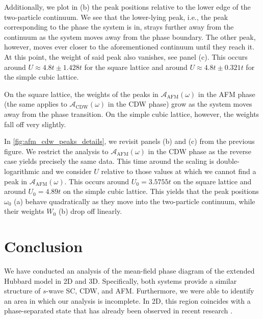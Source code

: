 \documentclass[
    reprint, 
    aps,
    preprintnumbers,
    twocolumn,
    prb,
    superscriptaddress
]{revtex4-2}
\newcommand{\spectral}[1]{\mathcal{A}_\text{#1}  (\omega)}
\begin{document}
Additionally, we plot in (b) the peak positions relative to the lower edge of the two-particle continuum.
We see that the lower-lying peak, i.e., the peak corresponding to the phase the system is in, 
strays further away from the continuum as the system moves away from the phase boundary.
The other peak, however, moves ever closer to the aforementioned continuum until they reach it.
At this point, the weight of said peak also vanishes, see panel (c).
This occurs around $U \approx 4.8t \pm 1.428t$ for the square lattice and around $U \approx 4.8t \pm 0.321t$ for the simple cubic lattice.

On the square lattice, the weights of the peaks in $\spectral{AFM}$ in the AFM phase (the same applies to $\spectral{CDW}$ in the CDW phase) grow as the system moves away from the phase transition.
On the simple cubic lattice, however, the weights fall off very slightly.

In \autoref{fig:afm_cdw_peaks_details}, we revisit panels (b) and (c) from the previous figure.
We restrict the analysis to $\spectral{AFM}$ in the CDW phase as the reverse case yields precisely the same data.
This time around the scaling is double-logarithmic and we consider $U$ relative to those values at which we cannot find a peak in $\spectral{AFM}$.
This occurs around $U_0 = 3.5755t$ on the square lattice and around $U_0 = 4.89t$ on the simple cubic lattice.
This yields that the peak positions $\omega_0$ (a) behave quadratically as they move into the two-particle continuum,
while their weights $W_0$ (b) drop off linearly.


\section{Conclusion}\label{sec:conclusion}


We have conducted an analysis of the mean-field phase diagram of the extended Hubbard model in 2D and 3D. 
Specifically, both systems provide a similar structure of $s$-wave SC, CDW, and AFM.
Furthermore, we were able to identify an area in which our analysis is incomplete.
In 2D, this region coincides with a phase-separated state that has already been observed in recent research \cite{Linner23}.
\end{document}
